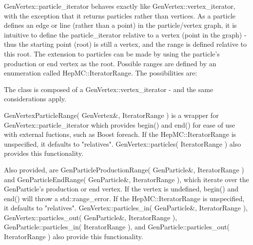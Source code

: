 \documentclass[11pt,letterpaper]{article}
\begin{document}
GenVertex::particle\_iterator behaves exactly like
GenVertex::vertex\_iterator, with the exception that it returns particles
rather than vertices.  As a particle defines an edge or line (rather
than a point) in the particle/vertex graph, it is intuitive to define
the particle\_iterator relative to a vertex (point in the graph) - thus
the starting point (root) is still a vertex, and the range is defined
relative to this root.  The extension to particles can be made by
using the particle's production or end vertex as the root.  Possible
ranges are defined by an enumeration called HepMC::IteratorRange.
The possibilities are:
\begin{itemize}\setlength{\itemsep}{0pt}
\end{itemize}

The class is composed of a GenVertex::vertex\_iterator - 
and the same considerations apply.

GenVertexParticleRange( GenVertex\&, IteratorRange ) is a wrapper for
GenVertex::particle\_iterator which provides begin() and end() for
ease of use with external fuctions, such as Boost foreach.
If the HepMC::IteratorRange is unspecified, it defaults to "relatives".
GenVertex::particles( IteratorRange ) also provides this functionality.

Also provided, are GenParticleProductionRange( GenParticle\&, IteratorRange )
and GenParticleEndRange( GenParticle\&, IteratorRange ), 
which iterate over the GenParticle's production or end vertex.  
If the vertex is undefined, begin() and end() will throw a std::range\_error.
If the HepMC::IteratorRange is unspecified, it defaults to "relatives".
GenVertex::particles\_in( GenParticle\&, IteratorRange ),
GenVertex::particles\_out( GenParticle\&, IteratorRange ),
GenParticle::particles\_in( IteratorRange ), and
GenParticle::particles\_out( IteratorRange ) also provide this functionality.
\end{document}
